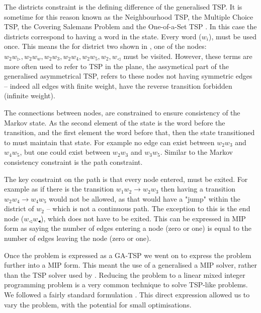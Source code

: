 \documentclass[11pt]{article}
\theoremstyle{plain}
\theoremstyle{definition}
\begin{document}
The districts constraint is the defining difference of the generalised TSP. It is sometime for this reason known as the Neighbourhood TSP, the Multiple Choice TSP, the Covering Salemans Problem and the One-of-a-Set TSP \parencite{Gudmundsson1999}. In this case the districts correspond to having a word in the state. Every word ($w_i$), must be used once. This means the for district two shown in , one of the nodes: ${w_2w_\triangleright, w_2w_w,w_2w_3,w_2w_4, w_2w_5, w_2,w_\triangleleft}$ must be visited.
However, these terms are more often used to refer to TSP in the plane, the assymetical part of the generalised asymmetrical TSP, refers to these nodes not having symmetric edges -- indeed all edges with finite weight, have the reverse transition forbidden (infinite weight).

The connections between nodes, are constrained to ensure consistency of the Markov state. As the second element of the state is the word before the transition, and the first element the word before that, then the state transitioned to must maintain that state. For example no edge can exist between $w_2w_3$ and $w_4w_5$, but one could exist between $w_2w_3$ and $w_3w_5$. Similar to the Markov consistency constraint is the path constraint.


The key constraint on the path is that every node entered, must be exited. For example as if there is the transition $w_1w_2 \to w_2w_3$ then having a transition $w_2w_4\to w_4w_5$ would not be allowed, as that would have a "jump" within the district  of $w_2$ -- which is not a continuous path. The exception to this is the end node ($w_\triangleleft w_\blacktriangleleft$), which does not have to be exited. This can be expressed in MIP form as saying the number of edges entering a node (zero or one) is equal to the number of edges leaving the node (zero or one).

Once the problem is expressed as a GA-TSP we went on to express the problem further into a MIP form. This meant the use of a generalised a MIP solver, rather than the TSP solver used by \textcite{Horvat2014}. Reducing the problem to a linear mixed integer programming problem is a very common technique to solve TSP-like problems. We followed a fairly standard formulation . This direct expression allowed us to vary the problem, with the potential for small optimisations. 
\end{document}
